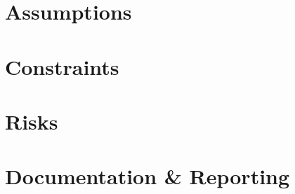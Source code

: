 \documentclass[11pt,letterpaper]{article}
\begin{document}
\section{Assumptions}

\section{Constraints}

\section{Risks}

\section{Documentation \& Reporting}

\newpage



{}
\end{document}
